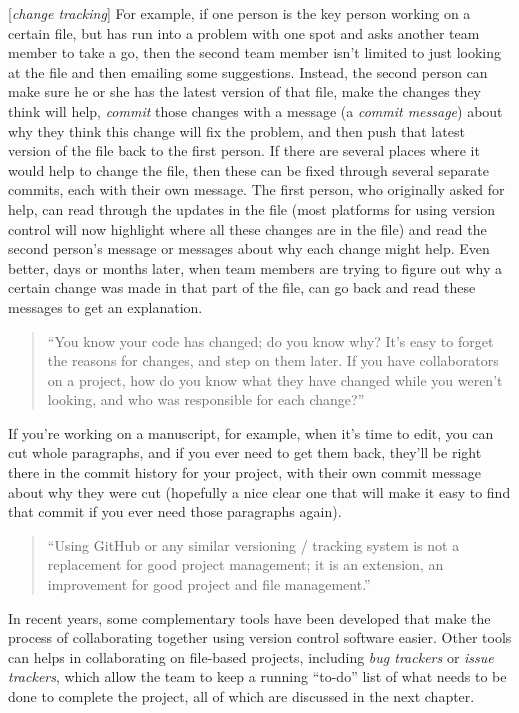 \documentclass[]{tufte-book}
\begin{document}
{[}\emph{change tracking}{]}
For example, if one person is the key person working on a certain file,
but has run into a problem with one spot and asks another team member to take a
go, then the second team member isn't limited to just looking at the file and
then emailing some suggestions. Instead, the second person can make sure he or
she has the latest version of that file, make the changes they think will help,
\emph{commit} those changes with a message (a \emph{commit message}) about why they think
this change will fix the problem, and then push that latest version of the file
back to the first person. If there are several places where it would help to
change the file, then these can be fixed through several separate commits, each
with their own message. The first person, who originally asked for help, can
read through the updates in the file (most platforms for using version control
will now highlight where all these changes are in the file) and read the second
person's message or messages about why each change might help. Even better, days
or months later, when team members are trying to figure out why a certain change
was made in that part of the file, can go back and read these messages to get an
explanation.

\begin{quote}
``You know your code has changed; do you know why? It's easy to forget the
reasons for changes, and step on them later. If you have collaborators on a
project, how do you know what they have changed while you weren't looking, and
who was responsible for each change?'' \citep{raymond2003art}
\end{quote}

If you're working on a manuscript, for
example, when it's time to edit, you can cut whole paragraphs, and if you ever
need to get them back, they'll be right there in the commit history for your
project, with their own commit message about why they were cut (hopefully a nice
clear one that will make it easy to find that commit if you ever need those
paragraphs again).

\begin{quote}
``Using GitHub or any similar versioning / tracking system is not a replacement
for good project management; it is an extension, an improvement for good
project and file management.'' \citep{perez2016ten}
\end{quote}

In recent years, some complementary tools have been developed that make the process of
collaborating together using version control software easier.
Other tools can helps in collaborating on file-based projects, including \emph{bug trackers}
or \emph{issue trackers}, which allow the team to keep a running ``to-do'' list of what needs
to be done to complete the project, all of which are discussed in the next chapter.
\end{document}

